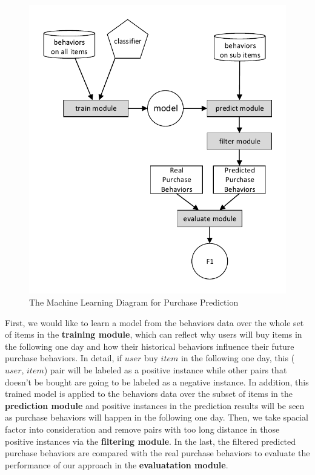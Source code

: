 \documentclass{llncs}
\begin{document}
\begin{figure}[htbp]
	\centering
	\includegraphics[scale=0.6]{images/system.pdf}
	\caption{The Machine Learning Diagram for Purchase Prediction}
	\label{fig:framework}
\end{figure}

First, we would like to learn a model from
the behaviors data over the whole set of items in the \textbf{training module},
which can reflect why users will buy items in the following one day
and how their historical behaviors influence their future purchase behaviors.
In detail, if $user$ buy $item$ in the following one day,
this ($user$, $item$) pair will be labeled as a positive instance
while other pairs that doesn't be bought
are going to be labeled as a negative instance.
In addition, this trained model is applied to the behaviors data over
the subset of items in the \textbf{prediction module}
and positive instances in the prediction results will be seen as
purchase behaviors will happen in the following one day.
Then, we take spacial factor into consideration and remove pairs
with too long distance in those positive instances
via the \textbf{filtering module}.
In the last, the filtered predicted purchase behaviors are
compared with the real purchase behaviors to evaluate
the performance of our approach in the \textbf{evaluatation module}.
\end{document}
